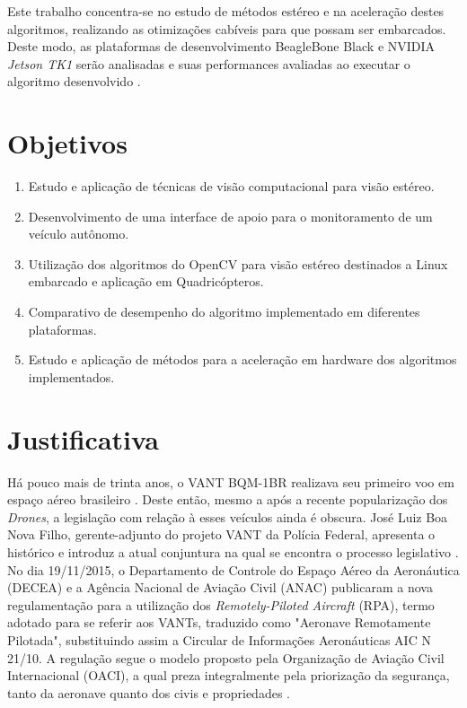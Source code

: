 Este trabalho concentra-se no estudo de métodos estéreo e na aceleração destes algoritmos, realizando as otimizações cabíveis para que possam ser embarcados. Deste modo, as plataformas de desenvolvimento BeagleBone Black \cite{BeagleBoardOrg} e NVIDIA \textit{Jetson TK1} \cite{JetsonTK1} serão analisadas e suas performances avaliadas ao executar o algoritmo desenvolvido \cite{Shah2014}. 


\section{Objetivos}
\label{objetivos}

\begin{enumerate}
	\item Estudo e aplicação de técnicas de visão computacional para visão estéreo.
	\item Desenvolvimento de uma interface de apoio para o monitoramento de um veículo autônomo.
	\item Utilização dos algoritmos do OpenCV para visão estéreo destinados a Linux embarcado e aplicação em Quadricópteros.
	\item Comparativo de desempenho do algoritmo implementado em diferentes plataformas.
	\item Estudo e aplicação de métodos para a aceleração em hardware dos algoritmos implementados.
\end{enumerate}


\section{Justificativa}

Há pouco mais de trinta anos, o VANT BQM-1BR realizava seu primeiro voo em espaço aéreo brasileiro \cite{Magno2009}. Deste então, mesmo a após a recente popularização dos \textit{Drones}, a legislação com relação à esses veículos ainda é obscura. José Luiz Boa Nova Filho, gerente-adjunto do projeto VANT da Polícia Federal, apresenta o histórico e introduz a atual conjuntura na qual se encontra o processo legislativo \cite{Filho2014}. No dia 19/11/2015, o Departamento de Controle do Espaço Aéreo da Aeronáutica (DECEA) e a Agência Nacional de Aviação Civil (ANAC) publicaram a nova regulamentação para a utilização dos \textit{Remotely-Piloted Aircraft} (RPA), termo adotado para se referir aos VANTs, traduzido como "Aeronave Remotamente Pilotada", substituindo assim a Circular de Informações Aeronáuticas AIC N 21/10. A regulação segue o modelo proposto pela Organização de Aviação Civil Internacional (OACI), a qual preza integralmente pela priorização da segurança, tanto da aeronave quanto dos civis e propriedades \cite{DECEA2015}. 

